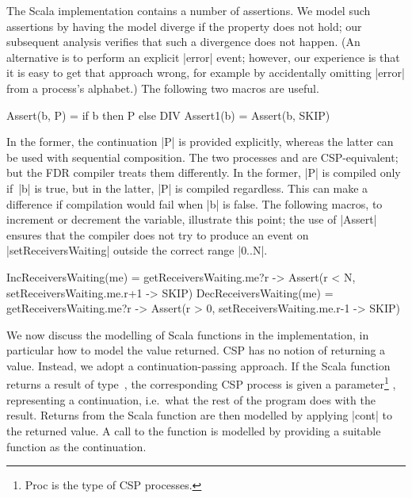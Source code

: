 The Scala implementation contains a number of assertions.  We model such
assertions by having the model diverge if the property does not hold; our
subsequent analysis verifies that such a divergence does not happen.  (An
alternative is to perform an explicit |error| event; however, our experience
is that it is easy to get that approach wrong, for example by accidentally
omitting |error| from a process's alphabet.)  The following two macros are
useful.
%
\begin{cspm}
Assert(b, P) = if b then P else DIV
Assert1(b) = Assert(b, SKIP)
\end{cspm}
%
In the former, the continuation |P| is provided explicitly, whereas the latter
can be used with sequential composition.  The two processes  and  are CSP-equivalent; but the FDR compiler treats
them differently.  In the former, |P| is compiled only if~|b| is true, but in
the latter, |P| is compiled regardless.  This can make a difference if
compilation would fail when |b| is false.  The following macros, to increment
or decrement the  variable, illustrate this point; the
use of |Assert| ensures that the compiler does not try to produce an event on
|setReceiversWaiting| outside the correct range |{0..N}|.
%
\begin{cspm}
IncReceiversWaiting(me) =
  getReceiversWaiting.me?r -> Assert(r < N, setReceiversWaiting.me.r+1 -> SKIP)
DecReceiversWaiting(me) = 
  getReceiversWaiting.me?r -> Assert(r > 0, setReceiversWaiting.me.r-1 -> SKIP)
\end{cspm}

We now discuss the modelling of Scala functions in the implementation, in
particular how to model the value returned.  CSP has no notion of returning a
value.  Instead, we adopt a continuation-passing approach.  If the Scala
function returns a result of type~, the corresponding CSP process is
given a parameter\footnote{{\cspmstyle Proc} is the type of CSP processes.}
, representing a continuation, i.e.~what the rest of
the program does with the result.  Returns from the Scala function are then
modelled by applying |cont| to the returned value.  A call to the function is
modelled by providing a suitable function as the continuation.

